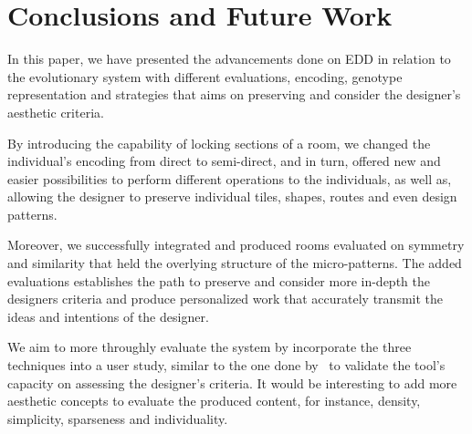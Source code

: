 \section{Conclusions and Future Work} \label{p2conclusion}

In this paper, we have presented the advancements done on EDD in relation to the evolutionary system with different evaluations, encoding, genotype representation and strategies that aims on preserving and consider the designer's aesthetic criteria.

By introducing the capability of locking sections of a room, we changed the individual's encoding from direct to semi-direct, and in turn, offered new and easier possibilities to perform different operations to the individuals, as well as, allowing the designer to preserve individual tiles, shapes, routes and even design patterns.


Moreover, we successfully integrated and produced rooms evaluated  on symmetry and similarity that held the overlying structure of the micro-patterns. The added evaluations establishes the path to preserve and consider more in-depth the designers criteria and produce personalized work that accurately transmit the ideas and intentions of the designer.


We aim to more throughly evaluate the system by incorporate the three techniques into a user study, similar to the one done by~\citet{Baldwin2017TowardsGeneration} to validate the tool's capacity on assessing the designer's criteria. It would be interesting to add more aesthetic concepts to evaluate the produced content, for instance, density, simplicity, sparseness and individuality.

